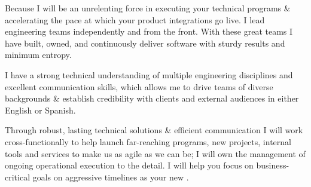 Because I will be an unrelenting force in executing your technical programs \& accelerating the pace at which your product integrations go live. I lead engineering teams independently and from the front. With these great teams I have built, owned, and continuously deliver software with sturdy results and minimum entropy.

I have a strong technical understanding of multiple engineering disciplines and excellent communication skills, which allows me to drive teams of diverse backgrounds \& establish credibility with clients and external audiences in either English or Spanish. 

Through robust, lasting technical solutions \& efficient communication I will work cross-functionally to help launch far-reaching programs, new projects, internal tools and services to make us as agile as we can be; I will own the management of ongoing operational execution to the detail. I will help you focus on business-critical goals on aggressive timelines as your new \jobTitle.